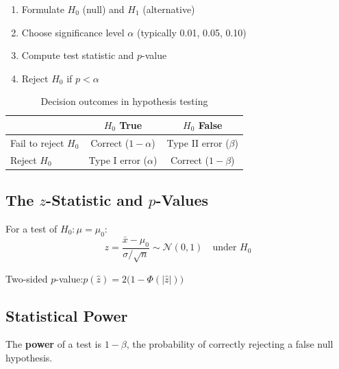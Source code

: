 \begin{enumerate}
  \item Formulate $H_0$ (null) and $H_1$ (alternative)
  \item Choose significance level $\alpha$ (typically 0.01, 0.05, 0.10)
  \item Compute test statistic and $p$-value
  \item Reject $H_0$ if $p < \alpha$
\end{enumerate}

\begin{table}[htp]
\centering
\caption{Decision outcomes in hypothesis testing}
\label{tbl_TypeErrors}
\renewcommand{\arraystretch}{1.3}
\begin{tabular}{@{}lcc@{}}
\toprule
& $H_0$ True & $H_0$ False \\
\midrule
Fail to reject $H_0$ & Correct ($1-\alpha$) & Type II error ($\beta$) \\
Reject $H_0$         & Type I error ($\alpha$) & Correct ($1-\beta$) \\
\bottomrule
\end{tabular}
\renewcommand{\arraystretch}{1}
\end{table}

\subsection{The $z$-Statistic and $p$-Values}

For a test of $H_0: \mu = \mu_0$:
\begin{equation}
  z = \frac{\bar{x} - \mu_0}{\sigma/\sqrt{n}}
  \sim \mathcal{N}(0,1) \quad \text{under } H_0
\end{equation}

\begin{tcolorbox}[keyresult]
Two-sided $p$-value:\quad $p(\hat{z}) = 2\bigl(1 - \Phi(|\hat{z}|)\bigr)$
\end{tcolorbox}

\subsection{Statistical Power}

The \textbf{power} of a test is $1 - \beta$, the probability of correctly
rejecting a false null hypothesis.

